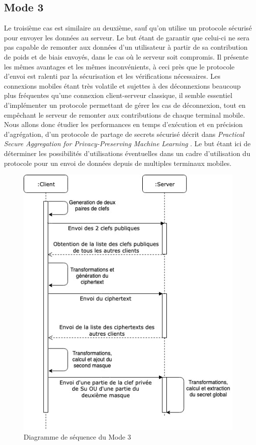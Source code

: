 \documentclass{article}
\begin{document}
\subsection{Mode 3}
Le troisième cas est similaire au deuxième, sauf qu'on utilise un protocole sécurisé pour envoyer les données au serveur. Le but étant de garantir que celui-ci ne sera pas capable de remonter aux données d’un utilisateur à partir de sa contribution de poids et de biais envoyés, dans le cas où le serveur soit compromis. Il présente les mêmes avantages et les mêmes inconvénients, à ceci près que le protocole d'envoi est ralenti par la sécurisation et les vérifications nécessaires.
Les connexions mobiles étant très volatile et sujettes à des déconnexions beaucoup plus fréquentes qu'une connexion client-serveur classique, il semble essentiel d'implémenter un protocole permettant de gérer les cas de déconnexion, tout en empêchant le serveur de remonter aux contributions de chaque terminal mobile.
Nous allons donc étudier les performances en temps d'exécution et en précision d'agrégation, d'un protocole de partage de secrets sécurisé décrit dans \textit{Practical Secure Aggregation for Privacy-Preserving Machine Learning }\cite{BonawitzPracticalSecureAggregation2017}. Le but étant ici de déterminer les possibilités d'utilisations éventuelles dans un cadre d'utilisation du protocole pour un envoi de données depuis de multiples terminaux mobiles.
    \begin{figure}[H]
    \includegraphics[width=\textwidth]{img/MODE_3_SEQ.jpg}
    \caption{Diagramme de séquence du Mode 3}
    \end{figure}
\end{document}
